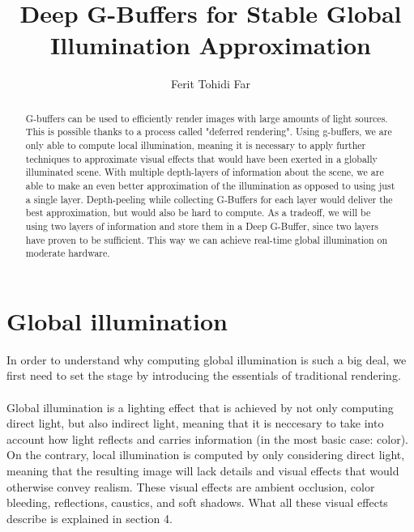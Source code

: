 \documentclass{ACGSeminar}
\begin{document}
\title{Deep G-Buffers for Stable Global Illumination Approximation}

\author{Ferit Tohidi Far}

\maketitle


\begin{abstract}%
G-buffers can be used to efficiently render images with large amounts of light sources. This is possible thanks to a process called "deferred rendering". Using g-buffers, we are only able to compute local illumination, meaning it is necessary to apply further techniques to approximate visual effects that would have been exerted in a globally illuminated scene. With multiple depth-layers of information about the scene, we are able to make an even better approximation of the illumination as opposed to using just a single layer. Depth-peeling while collecting G-Buffers for each layer would deliver the best approximation, but would also be hard to compute. As a tradeoff, we will be using two layers of information and store them in a Deep G-Buffer, since two layers have proven to be sufficient. This way we can achieve real-time global illumination on moderate hardware.
\end{abstract}

\tableofcontents

\label{cha:references}

\newpage

\label{cha:introduction}
\section{Global illumination}
	In order to understand why computing global illumination is such a big deal, we first need to set the stage by introducing the essentials of traditional rendering. \\\\
	Global illumination is a lighting effect that is achieved by not only computing direct light, but also indirect light, meaning that it is neccesary to take	into account how light reflects and carries information (in the most basic case: color). On the contrary, local illumination is computed by only considering direct light, meaning that the resulting image will lack details and visual effects that would otherwise convey realism. These visual effects are ambient occlusion, color bleeding, reflections, caustics, and soft shadows. What all these visual effects describe is explained in section 4.
\end{document}
